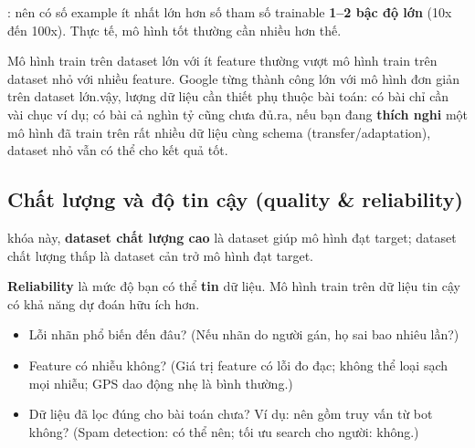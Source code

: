 \documentclass[12pt,a4paper]{article}
\begin{document}
\begin{tinhchat}[title={Quy tắc ngón tay cái}]\nRoughly: nên có số example ít nhất lớn hơn số tham số trainable \textbf{1--2 bậc độ lớn} (10x đến 100x). Thực tế, mô hình tốt thường cần nhiều hơn thế.\n\end{tinhchat}

\begin{luuy}
Mô hình train trên dataset lớn với ít feature thường vượt mô hình train trên dataset nhỏ với nhiều feature. Google từng thành công lớn với mô hình đơn giản trên dataset lớn.\n\nTuy vậy, lượng dữ liệu cần thiết phụ thuộc bài toán: có bài chỉ cần vài chục ví dụ; có bài cả nghìn tỷ cũng chưa đủ.\n{} ra, nếu bạn đang \textbf{thích nghi} một mô hình đã train trên rất nhiều dữ liệu cùng schema (transfer/adaptation), dataset nhỏ vẫn có thể cho kết quả tốt.
\end{luuy}

\subsection{Chất lượng và độ tin cậy (quality \& reliability)}

\begin{dinhnghia}[title={Định nghĩa thực dụng về chất lượng}]\nTrong khóa này, \textbf{dataset chất lượng cao} là dataset giúp mô hình đạt target; dataset chất lượng thấp là dataset cản trở mô hình đạt target.\n\end{dinhnghia}

\begin{dinhnghia}[title={Reliability}]\n\textbf{Reliability} là mức độ bạn có thể \textbf{tin} dữ liệu. Mô hình train trên dữ liệu tin cậy có khả năng dự đoán hữu ích hơn.\n\end{dinhnghia}

\begin{phuongphap}[title={Đo reliability: cần tự hỏi}]\n\begin{itemize}\n  \item Lỗi nhãn phổ biến đến đâu? (Nếu nhãn do người gán, họ sai bao nhiêu lần?)\n  \item Feature có nhiễu không? (Giá trị feature có lỗi đo đạc; không thể loại sạch mọi nhiễu; GPS dao động nhẹ là bình thường.)\n  \item Dữ liệu đã lọc đúng cho bài toán chưa? Ví dụ: nên gồm truy vấn từ bot không? (Spam detection: có thể nên; tối ưu search cho người: không.)\n\end{itemize}\n\end{phuongphap}
\end{document}

